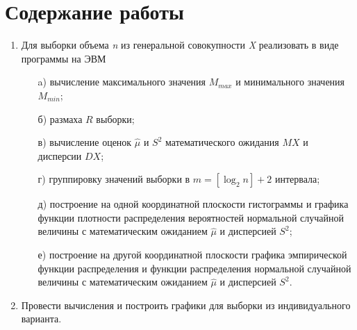\chapter{Содержание работы}

\begin{enumerate}
    \item Для выборки объема \textit{n} из генеральной совокупности \textit{X} реализовать в виде программы на ЭВМ

    \begin{itemize}
        \item [a)] вычисление максимального значения $M_{max}$ и минимального значения $M_{min}$;
        \item [б)] размаха $R$ выборки;
        \item [в)] вычисление оценок $\hat\mu$ и $S^2$ математического ожидания $MX$ и дисперсии $DX$;
        \item [г)] группировку значений выборки в $m = [\log_2 n] + 2$ интервала;
        \item [д)] построение на одной координатной плоскости гистограммы и графика функции плотности распределения вероятностей нормальной случайной величины с математическим ожиданием $\hat{\mu}$ и дисперсией $S^2$;
        \item [е)] построение на другой координатной плоскости графика эмпирической функции распределения и функции распределения нормальной случайной величины с математическим ожиданием $\hat{\mu}$ и дисперсией $S^2$.
    \end{itemize}

    \item Провести вычисления и построить графики для выборки из индивидуального варианта.
\end{enumerate}
